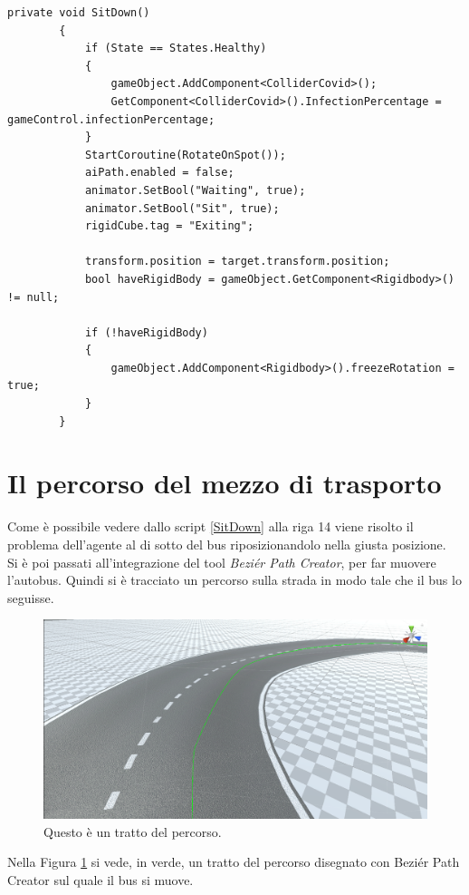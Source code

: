 \documentclass[12pt, openany]{book}
\begin{document}
	\begin{lstlisting}[language={[Sharp]C}, caption={Metodo per la seduta degli agenti}, label={SitDown}]
		private void SitDown()
		{
			if (State == States.Healthy)
			{
				gameObject.AddComponent<ColliderCovid>();
				GetComponent<ColliderCovid>().InfectionPercentage = 	gameControl.infectionPercentage;
			}
			StartCoroutine(RotateOnSpot());
			aiPath.enabled = false;
			animator.SetBool("Waiting", true);
			animator.SetBool("Sit", true);
			rigidCube.tag = "Exiting";
			
			transform.position = target.transform.position;
			bool haveRigidBody = gameObject.GetComponent<Rigidbody>() != null;
			
			if (!haveRigidBody)
			{
				gameObject.AddComponent<Rigidbody>().freezeRotation = true;
			}
		}
	\end{lstlisting}
	\section{Il percorso del mezzo di trasporto}
	Come è possibile vedere dallo script \ref{SitDown} alla riga 14 viene risolto il problema dell'agente al di sotto del bus riposizionandolo nella giusta posizione.\\
	Si è poi passati all'integrazione del tool \emph{Beziér Path Creator}, per far muovere l'autobus. Quindi si è tracciato un percorso sulla strada in modo tale che il bus lo seguisse.
	\begin{figure}[H]
		\centering
		\includegraphics[width=1\linewidth]{"Immagini/BezierPath.png"}
		\caption{Questo è un tratto del percorso.}
		\label{fig:BezierPath}
	\end{figure}
	Nella Figura \ref{fig:BezierPath} si vede, in verde, un tratto del percorso disegnato con Beziér Path Creator sul quale il bus si muove.\\
\end{document}
